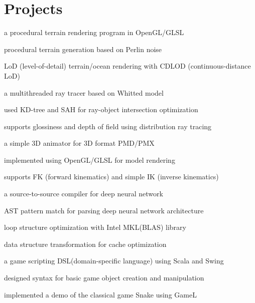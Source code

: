 \documentclass[]{deedy-resume-openfont}
\begin{document}
\begin{minipage}[t]{0.66\textwidth}

\section{Projects}

\begin{tightemize}
\item a procedural terrain rendering program in OpenGL/GLSL
\item procedural terrain generation based on Perlin noise
\item LoD (level-of-detail) terrain/ocean rendering with CDLOD (continuous-distance LoD)
\end{tightemize}
\sectionsep

\begin{tightemize}
\item a multithreaded ray tracer based on Whitted model
\item used KD-tree and SAH for ray-object intersection optimization
\item supports glossiness and depth of field using distribution ray tracing
\end{tightemize}
\sectionsep

\begin{tightemize}
\item a simple 3D animator for 3D format PMD/PMX
\item implemented using OpenGL/GLSL for model rendering
\item supports FK (forward kinematics) and simple IK (inverse kinematics)
\end{tightemize}
\sectionsep

\begin{tightemize}
\item a source-to-source compiler for deep neural network %
\item AST pattern match for parsing deep neural network architecture
\item loop structure optimization with Intel MKL(BLAS) library
\item data structure transformation for cache optimization
\end{tightemize}
\sectionsep

\begin{tightemize}
\item a game scripting DSL(domain-specific language) using Scala and Swing
\item designed syntax for basic game object creation and manipulation
\item implemented a demo of the classical game Snake using GameL
\end{tightemize}
\sectionsep

\end{minipage}
\end{document}
